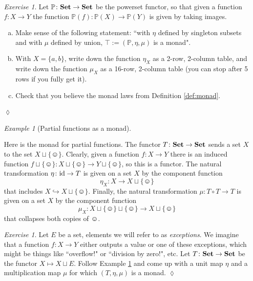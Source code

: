 \documentclass{book}
\def\tn{\textnormal}
\def\PP{{\mathbb P}}
\def\singleton{\{\smiley\}}
\def\to{\rightarrow}
\def\taking{\colon}
\def\inj{\hookrightarrow}
\def\too{\longrightarrow}
\def\id{\tn{id}}
\def\Set{{\bf Set}}
\theoremstyle{remark}
\newtheorem{example}[subsubsection]{Example}
\newtheorem{exc}[subsubsection]{Exercise}
\newenvironment{exercise}{\begin{exc}}{\hspace*{\fill}$\lozenge$\end{exc}}
\theoremstyle{definition}
\def\sexc{\begin{enumerate}[a.)]\setlength{\itemsep}{.1cm}\setlength{\parskip}{.1cm}\item}
\def\next{\item}
\def\endsexc{\end{enumerate}}
\begin{document}
\begin{exercise}\label{exc:power set monad}
Let $\PP\taking\Set\to\Set$ be the powerset functor, so that given a function $f\taking X\to Y$ the function $\PP(f)\taking\PP(X)\to\PP(Y)$ is given by taking images.
\sexc Make sense of the following statement: ``with $\eta$ defined by singleton subsets and with $\mu$ defined by union, $\top:=(\PP,\eta,\mu)$ is a monad".
\next  With $X=\{a,b\}$, write down the function $\eta_X$ as a 2-row, 2-column table, and write down the function $\mu_X$ as a 16-row, 2-column table (you can stop after 5 rows if you fully get it).
\next Check that you believe the monad laws from Definition \ref{def:monad}.
\endsexc
\end{exercise}

\begin{example}[Partial functions as a monad]\label{ex:partial functions as monad}

Here is the monad for partial functions. The functor $T\taking\Set\to\Set$ sends a set $X$ to the set $X\sqcup\singleton$. Clearly, given a function $f\taking X\to Y$ there is an induced function $f\sqcup\singleton\taking X\sqcup\singleton\to Y\sqcup\singleton$, so this is a functor. The natural transformation $\eta\taking\id\to T$ is given on a set $X$ by the component function $$\eta_X\taking X\to X\sqcup\singleton$$ that includes $X\inj X\sqcup\singleton$. Finally, the natural transformation $\mu\taking T\circ T\to T$ is given on a set $X$ by the component function $$\mu_X\taking X\sqcup\singleton\sqcup\singleton\too X\sqcup\singleton$$ that collapses both copies of $\smiley$.

\end{example}

\begin{exercise}\label{exc:exceptions}
Let $E$ be a set, elements we will refer to as {\em exceptions}. We imagine that a function $f\taking X\to Y$ either outputs a value or one of these exceptions, which might be things like ``overflow!" or ``division by zero!", etc. Let $T\taking\Set\to\Set$ be the functor $X\mapsto X\sqcup E$. Follow Example \ref{ex:partial functions as monad} and come up with a unit map $\eta$ and a multiplication map $\mu$ for which $(T,\eta,\mu)$ is a monad.
\end{exercise}
\end{document}
